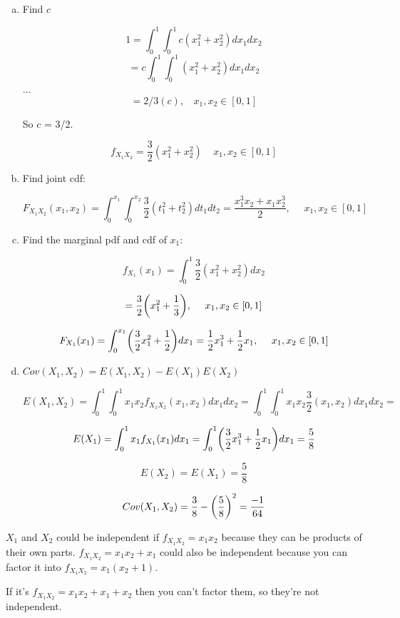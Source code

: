 \documentclass{report}
\DeclarePairedDelimiter\autobracket{(}{)}
\newcommand{\br}[1]{\autobracket*{#1}}
\begin{document}
\begin{enumerate}[(a)]

\item Find $c$

$$ 1 = \int_0^1 \int_0^1 c(x_1^2 + x_2^2) dx_1 dx_2 $$
$$  = c \int_0^1 \int_0^1 (x_1^2 + x_2^2) dx_1 dx_2 $$
...
$$  = 2/3(c), \ \ \ \ x_1, x_2 \in [0,1]  $$

So $c$ = 3/2.

$$f_{X_1 X_2} = \frac{3}{2}(x_1^2 + x_2^2) \ \ \ \ \ x_1, x_2 \in [0,1]$$

\item Find joint cdf:

$$F_{X_1X_2} (x_1, x_2) = \int_0^{x_1} \int_0^{x_2} \frac{3}{2}(t_1^2 + t_2^2) dt_1 dt_2 = \frac{x_1^3 x_2 + x_1 x_2^3}{2}, \ \ \ \ \ \ x_1, x_2 \in [0,1]$$

\item Find the marginal pdf and cdf of $x_1$:

$$f_{X_1}(x_1) = \int_0^1 \frac{3}{2} (x_1^2 + x_2^2) dx_2$$

$$=\frac{3}{2} \br{ x_1^2 + \frac{1}{3} }, \ \ \ \ x_1, x_2 \in [0,1]$$

$$F_{X_1}(x_1) = \int_{0}^{x_1} \br{ \frac{3}{2} x_1^2 + \frac{1}{2} } dx_1 = \frac{1}{2} x_1^3 + \frac{1}{2}x_1, \ \ \ \ x_1, x_2 \in [0,1]$$


\item $Cov(X_1, X_2) = E(X_1, X_2) - E(X_1) E(X_2)  $

$$E(X_1, X_2) = \int_0^1 \int_0^1 x_1 x_2 f_{X_1 X_2}(x_1, x_2) dx_1 dx_2  = \int_0^1 \int_0^1 x_1 x_2 \frac{3}{2}(x_1, x_2) dx_1 dx_2 = $$ 

$$E(X_1) = \int_0^1 x_1 f_{X_1} (x_1) dx_1 = \int_0^1 \br{\frac{3}{2}x_1^3 + \frac{1}{2}x_1} dx_1 = \frac{5}{8} $$

$$E(X_2) = E(X_1) = \frac{5}{8}$$

$$Cov(X_1, X_2) = \frac{3}{8} - \br{\frac{5}{8}}^2 = \frac{-1}{64}$$

\end{enumerate}



$X_1$ and $X_2$ could be independent if $f_{X_1 X_2} = x_1 x_2$ because they can be products of their own parts. $f_{X_1 X_2} = x_1 x_2 + x_1$ could also be independent because you can factor it into $f_{X_1 X_2} = x_1(x_2 + 1)$. 

If it's $f_{X_1 X_2} = x_1 x_2 + x_1 + x_2$ then you can't factor them, so they're not independent. 
\end{document}
